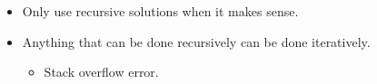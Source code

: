 \begin{itemize}
\begin{itemize}
            \item Only use recursive solutions when it makes sense.
            \item Anything that can be done recursively can be done iteratively.
                \begin{itemize}
                    \item Stack overflow error.
                \end{itemize}
        \end{itemize}
\end{itemize}
